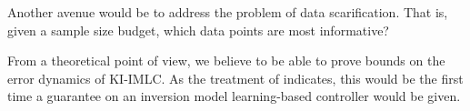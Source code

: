 Another avenue would be to address the problem of data scarification. That is, given a sample size budget, which data points are most informative? 

From a theoretical point of view, we believe to be able to prove bounds on the error dynamics of KI-IMLC. As the treatment of \cite{Tuongmodellearningsurvey2011} indicates, this would be the first time a guarantee on an inversion model learning-based controller would be given.



%
%
%
